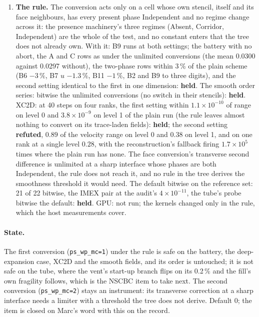\documentclass[11pt,a4paper]{article}
\newcommand{\code}[1]{\texttt{\small #1}}
\begin{document}
\begin{enumerate}[nosep]
      tube's start-up at the choked vent is a sensitivity of the NSCBC
      fill's branches to the interior at the per-mille level (the steps
      where Stage~3 found its vacuum folds), and it is the fill's item,
      not the limiter's.
\item \textbf{The rule.}  The conversion acts only on a cell whose own
      stencil, itself and its face neighbours, has every present phase
      Independent and no regime change across it: the presence
      machinery's three regimes (Absent, Corridor, Independent) are the
      whole of the test, and no constant enters that the tree does not
      already own.  With it: B9 runs at both settings; the battery with
      no abort, the A and C rows as under the unlimited conversions
      (the mean 0.0300 against 0.0297 without), the two-phase rows
      within 3\,\% of the plain scheme (B6 $-3\,\%$, B7 $u$ $-1.3\,\%$,
      B11 $-1\,\%$, B2 and B9 to three digits), and the second setting
      identical to the first in one dimension: \textbf{held}.  The
      smooth order series: bitwise the unlimited conversions (no switch in their
      stencils): \textbf{held}.  XC2D: at 40 steps on four ranks, the first setting within
      $1.1\times10^{-10}$ of range on level 0 and $3.8\times10^{-9}$ on
      level 1 of the plain run (the rule leaves almost nothing to convert
      on its trace-laden fields): \textbf{held}; the second setting
      \textbf{refuted}, $0.89$ of the velocity range on level 0 and $0.38$
      on level 1, and on one rank at a single level $0.28$, with the
      reconstruction's fallback firing $1.7\times10^{5}$ times where the
      plain run has none.  The face conversion's transverse second
      difference is unlimited at a sharp interface whose phases are both
      Independent, the rule does not reach it, and no rule in the tree
      derives the smoothness threshold it would need.  The default
      bitwise on the reference set: 21 of 22 bitwise, the IMEX pair at the audit's $4\times10^{-11}$, the tube's probe bitwise the default: \textbf{held}.  GPU: not run; the kernels changed only in the rule, which the host
      measurements cover.
\end{enumerate}

\paragraph{State.}  The first conversion (\code{ps\_wp\_mc=1}) under the
rule is safe on the battery, the deep-expansion case, XC2D and the
smooth fields, and its order is untouched; it is not safe on the tube,
where the vent's start-up branch flips on its 0.2\,\% and the fill's own
fragility follows, which is the NSCBC item to take next.  The second
conversion (\code{ps\_wp\_mc=2}) stays an instrument: its transverse
correction at a sharp interface needs a limiter with a threshold the
tree does not derive.  Default 0; the item is closed on Marc's word with
this on the record.
\end{document}
